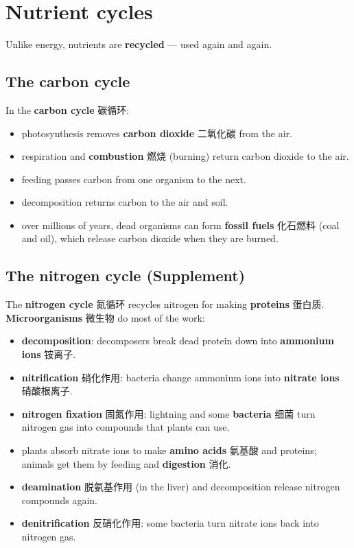 \documentclass[11pt]{article}
\begin{document}
\section*{Nutrient cycles}

Unlike energy, nutrients are \textbf{recycled} — used again and again.

\subsection*{The carbon cycle}

In the \textbf{carbon cycle} 碳循环:

\begin{itemize}
\item photosynthesis removes \textbf{carbon dioxide} 二氧化碳 from the air.

\item respiration and \textbf{combustion} 燃烧 (burning) return carbon dioxide to the air.

\item feeding passes carbon from one organism to the next.

\item decomposition returns carbon to the air and soil.

\item over millions of years, dead organisms can form \textbf{fossil fuels} 化石燃料 (coal and oil), which release carbon dioxide when they are burned.

\end{itemize}

\subsection*{The nitrogen cycle (Supplement)}

The \textbf{nitrogen cycle} 氮循环 recycles nitrogen for making \textbf{proteins} 蛋白质. \textbf{Microorganisms} 微生物 do most of the work:

\begin{itemize}
\item \textbf{decomposition}: decomposers break dead protein down into \textbf{ammonium ions} 铵离子.

\item \textbf{nitrification} 硝化作用: bacteria change ammonium ions into \textbf{nitrate ions} 硝酸根离子.

\item \textbf{nitrogen fixation} 固氮作用: lightning and some \textbf{bacteria} 细菌 turn nitrogen gas into compounds that plants can use.

\item plants absorb nitrate ions to make \textbf{amino acids} 氨基酸 and proteins; animals get them by feeding and \textbf{digestion} 消化.

\item \textbf{deamination} 脱氨基作用 (in the liver) and decomposition release nitrogen compounds again.

\item \textbf{denitrification} 反硝化作用: some bacteria turn nitrate ions back into nitrogen gas.

\end{itemize}
\end{document}
